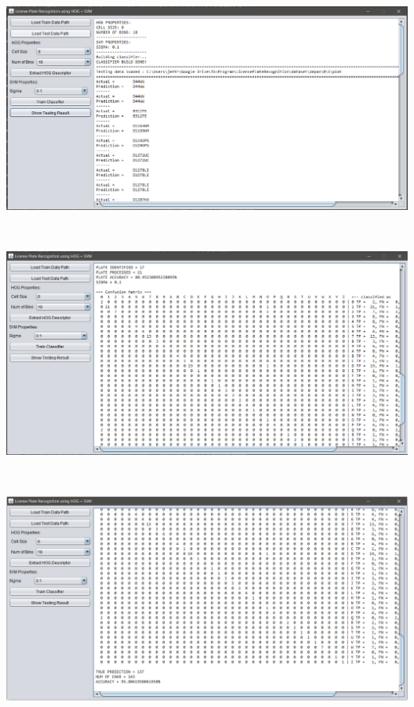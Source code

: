 \begin{adjustbox}{width=1\textwidth}
	\noindent\begin{minipage}{\linewidth}
		\centering\includegraphics[width=14cm]{images/TampilanAntarmukaTesting1.png}
		\label{fig:TampilanAntarmukaTesting1}
	\end{minipage}
\end{adjustbox}\\
\begin{adjustbox}{width=1\textwidth}
	\noindent\begin{minipage}{\linewidth}
		\centering\includegraphics[width=14cm]{images/TampilanAntarmukaTesting2.png}
		\label{fig:TampilanAntarmukaTesting2}
	\end{minipage}
\end{adjustbox}\\
\begin{adjustbox}{width=1\textwidth}
	\noindent\begin{minipage}{\linewidth}
		\centering\includegraphics[width=14cm]{images/TampilanAntarmukaTesting3.png}
		\label{fig:TampilanAntarmukaTesting3}
	\end{minipage}
\end{adjustbox}\\
